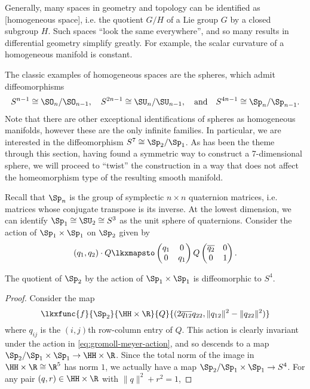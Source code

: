 Generally, many spaces in geometry and topology can be identified as [homogeneous space], i.e. the quotient $G/H$ of a Lie group $G$ by a closed subgroup $H$. Such spaces ``look the same everywhere'', and so many results in differential geometry simplify greatly. For example, the scalar curvature of a homogeneous manifold is constant.

The classic examples of homogeneous spaces are the spheres, which admit diffeomorphisms
\[
	S^{n-1}\cong \SO_n/\SO_{n-1},\quad S^{2n-1}\cong \SU_n/\SU_{n-1},\quad\textrm{and}\quad S^{4n-1}\cong \Sp_n/\Sp_{n-1}.
\]
Note that there are other exceptional identifications of spheres as homogeneous manifolds, however these are the only infinite families. In particular, we are interested in the diffeomorphism $S^7\cong \Sp_2/\Sp_1$. As has been the theme through this section, having found a symmetric way to construct a 7-dimensional sphere, we will proceed to ``twist'' the construction in a way that does not affect the homeomorphism type of the resulting smooth manifold.

Recall that $\Sp_n$ is the group of symplectic $n\times n$ quaternion matrices, i.e. matrices whose conjugate transpose is its inverse. At the lowest dimension, we can identify $\Sp_1\cong \SU_2\cong S^3$ as the unit sphere of quaternions. Consider the action of $\Sp_1\times \Sp_1$ on $\Sp_2$ given by
\begin{equation}\label{eq:gromoll-meyer-action}
	(q_1, q_2)\cdot Q \lkxmapsto \begin{pmatrix} q_1 & 0\\ 0 & q_1\end{pmatrix}Q\begin{pmatrix}\overline{q_2} & 0\\ 0 & 1\end{pmatrix}.
\end{equation}

\begin{proposition}
	The quotient of $\Sp_2$ by the action of $\Sp_1\times \Sp_1$ is diffeomorphic to $S^4$.
\end{proposition}
\begin{proof}
	Consider the map
	\[
		\lkxfunc{f}{\Sp_2}{\HH\times \R}{Q}{(2\overline{q_{12}}q_{22}, \|q_{12}\|^2 - \|q_{22}\|^2)}
	\]
	where $q_{ij}$ is the $(i,j)$th row-column entry of $Q$. This action is clearly invariant under the action in \cref{eq:gromoll-meyer-action}, and so descends to a map $\Sp_2/\Sp_1\times \Sp_1 \to \HH\times \R$. Since the total norm of the image in $\HH\times \R\cong \R^5$ has norm $1$, we actually have a map $\Sp_2/\Sp_1\times \Sp_1\to S^4$. For any pair $(q,r)\in \HH\times \R$ with $\|q\|^2+r^2=1$, 
\end{proof}

